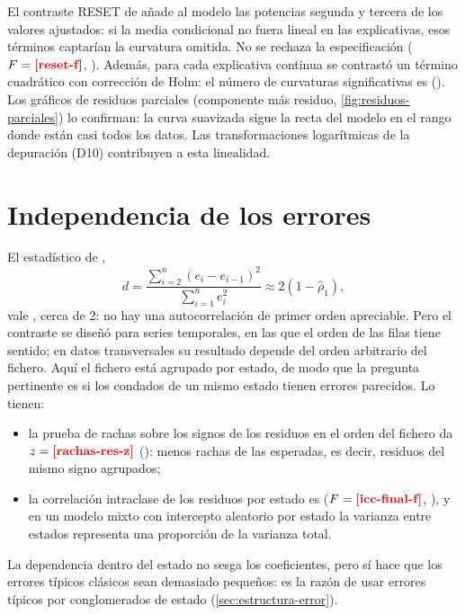El contraste RESET de \textcite{ramsey1969} añade al modelo las potencias segunda y tercera de los
valores ajustados: si la media condicional no fuera lineal en las explicativas, esos términos
captarían la curvatura omitida. No se rechaza la especificación ($F=\res{reset-f}$,
). Además, para cada explicativa continua se contrastó un término cuadrático con
corrección de Holm: el número de curvaturas significativas es 
(). Los gráficos de residuos parciales (componente más residuo,
\cref{fig:residuos-parciales}) lo confirman: la curva suavizada sigue la recta del modelo en el
rango donde están casi todos los datos. Las transformaciones logarítmicas de la depuración
(D10) contribuyen a esta linealidad.


\section{Independencia de los errores}

El estadístico de \textcite{durbin1950},
\[
d=\frac{\sum_{i=2}^{n}(e_i-e_{i-1})^2}{\sum_{i=1}^{n}e_i^2}\approx 2(1-\hat\rho_1),
\]
vale , cerca de 2: no hay una autocorrelación de primer orden apreciable. Pero el
contraste se diseñó para series temporales, en las que el orden de las filas tiene sentido; en
datos transversales su resultado depende del orden arbitrario del fichero. Aquí el fichero está
agrupado por estado, de modo que la pregunta pertinente es si los condados de un mismo estado
tienen errores parecidos. Lo tienen:
\begin{itemize}
  \item la prueba de rachas sobre los signos de los residuos en el orden del fichero da $z=\res{rachas-res-z}$
  (): menos rachas de las esperadas, es decir, residuos del mismo signo agrupados;
  \item la correlación intraclase de los residuos por estado es 
  ($F=\res{icc-final-f}$, ), y en un modelo mixto con intercepto aleatorio por estado
  la varianza entre estados representa una proporción  de la varianza total.
\end{itemize}
La dependencia dentro del estado no sesga los coeficientes, pero sí hace que los errores típicos
clásicos sean demasiado pequeños: es la razón de usar errores típicos por conglomerados de estado
(\cref{sec:estructura-error}).


